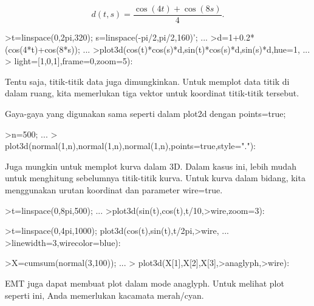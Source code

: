 \documentclass[a4paper,10pt]{article}
\begin{document}
\begin{eulernotebook}
\begin{eulercomment}
\begin{eulercomment}
\begin{eulercomment}
\end{eulercomment}
\begin{eulerformula}
\[
d(t,s) = \frac{\cos(4t)+\cos(8s)}{4}.
\]
\end{eulerformula}
\begin{eulerprompt}
>t=linspace(0,2pi,320); s=linspace(-pi/2,pi/2,160)'; ...
>d=1+0.2*(cos(4*t)+cos(8*s)); ...
>plot3d(cos(t)*cos(s)*d,sin(t)*cos(s)*d,sin(s)*d,hue=1, ...
>  light=[1,0,1],frame=0,zoom=5):
\end{eulerprompt}
\begin{eulercomment}
Tentu saja, titik-titik data juga dimungkinkan. Untuk memplot data
titik di dalam ruang, kita memerlukan tiga vektor untuk koordinat
titik-titik tersebut.

Gaya-gaya yang digunakan sama seperti dalam plot2d dengan points=true;
\end{eulercomment}
\begin{eulerprompt}
>n=500;  ...
>  plot3d(normal(1,n),normal(1,n),normal(1,n),points=true,style="."):
\end{eulerprompt}
\begin{eulercomment}
Juga mungkin untuk memplot kurva dalam 3D. Dalam kasus ini, lebih
mudah untuk menghitung sebelumnya titik-titik kurva. Untuk kurva dalam
bidang, kita menggunakan urutan koordinat dan parameter wire=true.
\end{eulercomment}
\begin{eulerprompt}
>t=linspace(0,8pi,500); ...
>plot3d(sin(t),cos(t),t/10,>wire,zoom=3):
\end{eulerprompt}
\begin{eulerprompt}
>t=linspace(0,4pi,1000); plot3d(cos(t),sin(t),t/2pi,>wire, ...
>linewidth=3,wirecolor=blue):
\end{eulerprompt}
\begin{eulerprompt}
>X=cumsum(normal(3,100)); ...
> plot3d(X[1],X[2],X[3],>anaglyph,>wire):
\end{eulerprompt}
\begin{eulercomment}
EMT juga dapat membuat plot dalam mode anaglyph. Untuk melihat plot
seperti ini, Anda memerlukan kacamata merah/cyan.
\end{eulercomment}

\end{eulercomment}
\end{eulercomment}
\end{eulernotebook}
\end{document}
